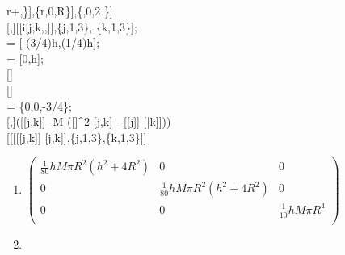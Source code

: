 \documentclass[10pt]{article}
\begin{document}
\begin{enumerate}
\begin{enumerate}
{        r+,\}],\{r,0,R\}],\{\theta ,0,2 \}]\\
        [,]\text{:=}[[i[j,k,,]],\{j,1,3\}, \{k,1,3\}];\\
         = [-(3/4)h,(1/4)h];\\
         = [0,h];\\
        []\\
        []\\
         = \{0,0,-3/4\};\\
        [,]\text{:=}([[j,k]] -M ([]{}^{\wedge}2 [j,k] - [[j]]
        [[k]]))\\
        [[[[[j,k]] \text{==} [j,k]],\{j,1,3\},\{k,1,3\}]]
      }
      \begin{enumerate}
        \item\begin{doublespace}
               \noindent\(\left(
               \begin{array}{ccc}
                 \frac{1}{80} h M \pi  R^2 \left(h^2+4 R^2\right) & 0                                              & 0                       \\
                 0                                              & \frac{1}{80} h M \pi  R^2 \left(h^2+4 R^2\right) & 0                       \\
                 0                                              & 0                                              & \frac{1}{10} h M \pi  R^4 \\
               \end{array}
               \right)\)
        \end{doublespace}
        \item{}
\end{enumerate}
\end{enumerate}
\end{enumerate}
\end{document}
